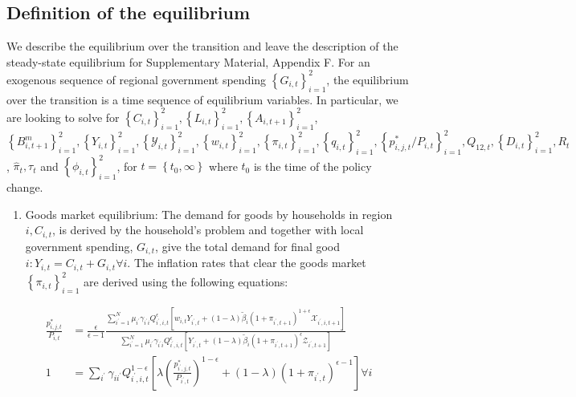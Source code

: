 \documentclass[\latexroot/\projectname]{subfiles}
\begin{document}
\subsection{Definition of the equilibrium}
We describe the equilibrium over the transition and leave the description of the steady-state equilibrium for Supplementary Material, Appendix F. For an exogenous sequence of regional government spending $\left\{G_{i, t}\right\}_{i=1}^{2}$, the equilibrium over the transition is a time sequence of equilibrium variables. In particular, we are looking to solve for $\left\{C_{i, t}\right\}_{i=1}^{2},\left\{L_{i, t}\right\}_{i=1}^{2},\left\{A_{i, t+1}\right\}_{i=1}^{2}$, $\left\{B_{i, t+1}^{m}\right\}_{i=1}^{2},\left\{Y_{i, t}\right\}_{i=1}^{2},\left\{\mathcal{Y}_{i, t}\right\}_{i=1}^{2},\left\{w_{i, t}\right\}_{i=1}^{2},\left\{\pi_{i, t}\right\}_{i=1}^{2},\left\{q_{i, t}\right\}_{i=1}^{2},\left\{p_{i, j, t}^{*} / P_{i, t}\right\}_{i=1}^{2}, Q_{12, t},\left\{D_{i, t}\right\}_{i=1}^{2}, R_{t}$, $\hat{\pi}_{t}, \tau_{t}$ and $\left\{\phi_{i, t}\right\}_{i=1}^{2}$, for $t=\left\{t_{0}, \infty\right\}$ where $t_{0}$ is the time of the policy change.

\begin{enumerate}
  \item Goods market equilibrium: The demand for goods by households in region $i, C_{i, t}$, is derived by the household's problem and together with local government spending, $G_{i, t}$, give the total demand for final good $i: Y_{i, t}=C_{i, t}+G_{i, t} \forall i$. The inflation rates that clear the goods market $\left\{\pi_{i, t}\right\}_{i=1}^{2}$ are derived using the following equations:
\end{enumerate}

$$
\begin{aligned}
\frac{p_{i, j, t}^{*}}{P_{i, t}} & =\frac{\epsilon}{\epsilon-1} \frac{\sum_{i^{\prime}=1}^{N} \mu_{i^{\prime}} \gamma_{i^{\prime} i} Q_{i^{\prime}, i, t}^{\epsilon}\left[w_{i, t} Y_{i^{\prime}, t}+(1-\lambda) \tilde{\beta}_{i}\left(1+\pi_{i^{\prime}, t+1}\right)^{1+\epsilon} \mathcal{X}_{i^{\prime}, i, t+1}\right]}{\sum_{i^{\prime}=1}^{N} \mu_{i^{\prime}} \gamma_{i^{\prime} i} Q_{i^{\prime}, i, t}^{\epsilon}\left[Y_{i^{\prime}, t}+(1-\lambda) \tilde{\beta}_{i}\left(1+\pi_{i^{\prime}, t+1}\right)^{\epsilon} \mathcal{Z}_{i^{\prime}, t+1}\right]} \\
1 & =\sum_{i^{\prime}} \gamma_{i i^{\prime}} Q_{i^{\prime}, i, t}^{1-\epsilon}\left[\lambda\left(\frac{p_{i^{\prime}, j, t}^{*}}{P_{i^{\prime}, t}}\right)^{1-\epsilon}+(1-\lambda)\left(1+\pi_{i^{\prime}, t}\right)^{\epsilon-1}\right] \forall i
\end{aligned}
$$
\end{document}
